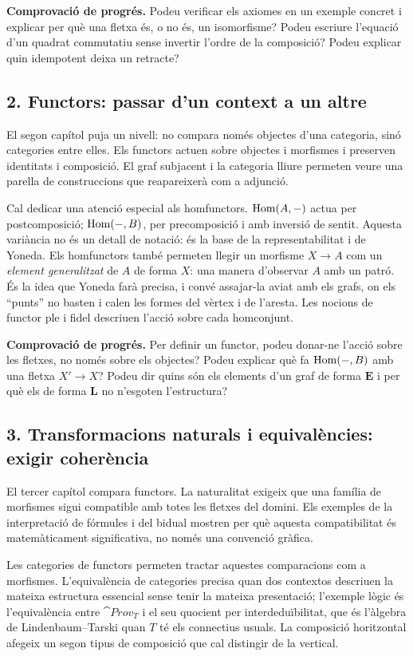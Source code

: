 \noindent\textbf{Comprovació de progrés.} Podeu verificar els axiomes
en un exemple concret i explicar per què una fletxa és, o no és,
un isomorfisme? Podeu escriure l'equació d'un quadrat commutatiu
sense invertir l'ordre de la composició? Podeu explicar quin
idempotent deixa un retracte?

\subsection*{2. Functors: passar d'un context a un altre}

El segon capítol puja un nivell: no compara només objectes d'una
categoria, sinó categories entre elles. Els functors actuen sobre
objectes i morfismes i preserven identitats i composició. El graf
subjacent i la categoria lliure permeten veure una parella de
construccions que reapareixerà com a adjunció.

Cal dedicar una atenció especial als homfunctors. $\operatorname{Hom}(A,-)$
actua per postcomposició; $\operatorname{Hom}(-,B)$, per precomposició i amb
inversió de sentit. Aquesta variància no és un detall de notació:
és la base de la representabilitat i de Yoneda. Els homfunctors també
permeten llegir un morfisme $X\to A$ com un \emph{element
generalitzat} de $A$ de forma $X$: una manera d'observar $A$ amb
un patró. És la idea que Yoneda farà precisa, i convé assajar-la
aviat amb els grafs, on els \enquote{punts} no basten i calen les
formes del vèrtex i de l'aresta. Les nocions de
functor ple i fidel descriuen l'acció sobre cada homconjunt.

\noindent\textbf{Comprovació de progrés.} Per definir un functor,
podeu donar-ne l'acció sobre les fletxes, no només sobre els objectes?
Podeu explicar què fa $\operatorname{Hom}(-,B)$ amb una fletxa $X'\to X$?
Podeu dir quins són els elements d'un graf de forma $\mathbf E$ i
per què els de forma $\mathbf L$ no n'esgoten l'estructura?

\subsection*{3. Transformacions naturals i equivalències: exigir coherència}

El tercer capítol compara functors. La naturalitat exigeix que
una família de morfismes sigui compatible amb totes les fletxes
del domini. Els exemples de la interpretació de fórmules i del
bidual mostren per què aquesta compatibilitat és matemàticament
significativa, no només una convenció gràfica.

Les categories de functors permeten tractar aquestes comparacions
com a morfismes. L'equivalència de categories precisa quan dos
contextos descriuen la mateixa estructura essencial sense tenir
la mateixa presentació; l'exemple lògic és l'equivalència entre
$\cat{Prov}_T$ i el seu quocient per interdeduïbilitat, que és
l'àlgebra de Lindenbaum--Tarski quan $T$ té els connectius usuals. La composició horitzontal afegeix un
segon tipus de composició que cal distingir de la vertical.

